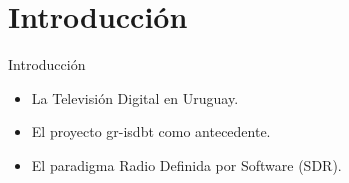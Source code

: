 \section{Introducción}

\begin{frame}{Introducción}
	\begin{itemize}
		\item {	La Televisión Digital en Uruguay.}
		\item {	El proyecto gr-isdbt como antecedente. }
		\item {	El paradigma Radio Definida por Software (SDR).	}
	\end{itemize}
\end{frame}
